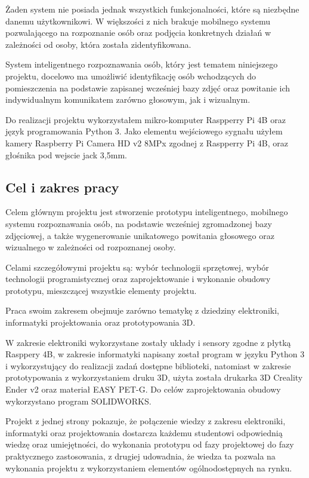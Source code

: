 \documentclass[a4paper,12pt,reqno]{article}
\begin{document}
Żaden system nie posiada jednak wszystkich funkcjonalności, które są niezbędne danemu użytkownikowi. W większości z nich brakuje mobilnego systemu pozwalającego na rozpoznanie osób oraz podjęcia konkretnych działań w zależności od osoby, która została zidentyfikowana.

System inteligentnego rozpoznawania osób, który jest tematem niniejszego projektu, docelowo ma umożliwić identyfikację osób wchodzących do pomieszczenia na podstawie zapisanej wcześniej bazy zdjęć oraz powitanie ich indywidualnym komunikatem zarówno głosowym, jak i wizualnym.

Do realizacji projektu wykorzystałem mikro-komputer Raspperry Pi 4B oraz język programowania Python 3. Jako elementu wejściowego sygnału użyłem kamery Raspberry Pi Camera HD v2 8MPx zgodnej z Raspperry Pi 4B, oraz głośnika pod wejscie jack 3,5mm.

\subsection{Cel i zakres pracy}

Celem głównym projektu jest stworzenie prototypu inteligentnego, mobilnego systemu rozpoznawania osób, na podstawie wcześniej zgromadzonej bazy zdjęciowej, a także wygenerowanie unikatowego powitania głosowego oraz wizualnego w zależności od rozpoznanej osoby.

Celami szczegółowymi projektu są: wybór technologii sprzętowej, wybór technologii programistycznej oraz zaprojektowanie i wykonanie obudowy prototypu, mieszczącej wszystkie elementy projektu.

Praca swoim zakresem obejmuje zarówno tematykę z dziedziny elektroniki, informatyki projektowania oraz prototypowania 3D.

W zakresie elektroniki wykorzystane zostały układy i sensory zgodne z płytką Rasppery 4B, w zakresie informatyki napisany został program w języku Python 3 i wykorzystujący do realizacji zadań dostępne biblioteki, natomiast w zakresie prototypowania z wykorzystaniem druku 3D, użyta została drukarka 3D Creality Ender v2 oraz materiał EASY PET-G. Do celów zaprojektowania obudowy wykorzystano program SOLIDWORKS.

Projekt z jednej strony pokazuje, że połączenie wiedzy z zakresu elektroniki, informatyki oraz projektowania dostarcza każdemu studentowi odpowiednią wiedzę oraz umiejętności, do wykonania prototypu od fazy projektowej do fazy praktycznego zastosowania,  z drugiej udowadnia, że wiedza ta pozwala na wykonania projektu z wykorzystaniem elementów ogólnodostępnych na rynku.
\end{document}
